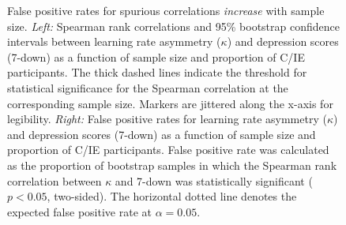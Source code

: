 \documentclass[a4paper,notitlepage,12pt]{article}
\begin{document}
\clearpage
\begin{figure}[h]
    \centering
    \caption{False positive rates for spurious correlations \emph{increase} with sample size. \textit{Left:} Spearman rank correlations and 95\% bootstrap confidence intervals between learning rate asymmetry ($\kappa$) and depression scores (7-down) as a function of sample size and proportion of C/IE participants. The thick dashed lines indicate the threshold for statistical significance for the Spearman correlation at the corresponding sample size. Markers are jittered along the x-axis for legibility. \textit{Right:} False positive rates for learning rate asymmetry ($\kappa$) and depression scores (7-down) as a function of sample size and proportion of C/IE participants. False positive rate was calculated as the proportion of bootstrap samples in which the Spearman rank correlation between $\kappa$ and 7-down was statistically significant ($p<0.05$, two-sided). The horizontal dotted line denotes the expected false positive rate at $\alpha = 0.05$.}
    \label{fig:fig04}
\end{figure}

\clearpage
\printbibliography
\end{document}

